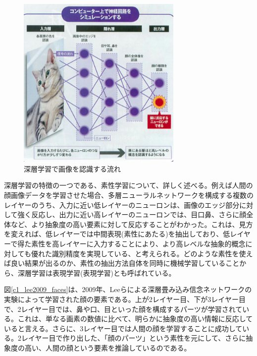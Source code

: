 \begin{figure}[tbp]
 \begin{center}
  \includegraphics[width=80mm]{img/c1/nikkei}
 \end{center}
 \caption{深層学習で画像を認識する流れ}
 \label{c1_nikkei}
\end{figure}
深層学習の特徴の一つである、素性学習について、詳しく述べる。例えば人間の顔画像データを学習させた場合、多層ニューラルネットワークを構成する複数のレイヤーのうち、入力に近い低レイヤーのニューロンは、画像のエッジ部分に対して強く反応し、出力に近い高レイヤーのニューロンでは、目口鼻、さらに顔全体など、より抽象度の高い要素に対して反応することがわかった。これは、見方を変えれば、低レイヤーでは中間表現(素性にあたる)を抽出しており、低レイヤーで得た素性を高レイヤーに入力することにより、より高レベルな抽象的概念に対しても優れた識別精度を実現している、と考えられる。どのような素性を使えば良い結果が出るのか、素性の抽出方法自体を同時に機械学習していることから、深層学習は表現学習(表現学習)とも呼ばれている。\par
図\ref{c1_lee2009_faces}は、2009年、Leeらによる深層畳み込み信念ネットワークの実験によって学習された顔の要素である。上が2レイヤー目、下が3レイヤー目で、2レイヤー目では、鼻や口、目といった顔を構成するパーツが学習されている。これは、単なる画素の数値に比べて、明らかに抽象度の高い情報に反応していると言える。さらに、3レイヤー目では人間の顔を学習することに成功している。2レイヤー目で作り出した、「顔のパーツ」という素性を元にして、さらに抽象度の高い、人間の顔という要素を推論しているのである。\cite{lee2009convolutional}
